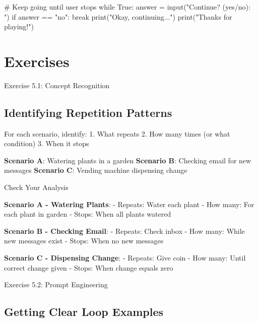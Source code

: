 \documentclass[
  letterpaper,
  DIV=11,
  numbers=noendperiod,
  oneside]{scrreprt}
\newenvironment{Shaded}{}{}
\newcommand{\BuiltInTok}[1]{\textcolor[rgb]{0.84,0.23,0.29}{#1}}
\newcommand{\CommentTok}[1]{\textcolor[rgb]{0.42,0.45,0.49}{#1}}
\newcommand{\ControlFlowTok}[1]{\textcolor[rgb]{0.84,0.23,0.29}{#1}}
\newcommand{\NormalTok}[1]{\textcolor[rgb]{0.14,0.16,0.18}{#1}}
\newcommand{\OperatorTok}[1]{\textcolor[rgb]{0.14,0.16,0.18}{#1}}
\newcommand{\StringTok}[1]{\textcolor[rgb]{0.01,0.18,0.38}{#1}}
\newcommand{\VariableTok}[1]{\textcolor[rgb]{0.89,0.38,0.04}{#1}}
\begin{document}
\begin{Shaded}
\begin{Highlighting}[]
\CommentTok{\# Keep going until user stops}
\ControlFlowTok{while} \VariableTok{True}\NormalTok{:}
\NormalTok{    answer }\OperatorTok{=} \BuiltInTok{input}\NormalTok{(}\StringTok{"Continue? (yes/no): "}\NormalTok{)}
    \ControlFlowTok{if}\NormalTok{ answer }\OperatorTok{==} \StringTok{"no"}\NormalTok{:}
        \ControlFlowTok{break}
    \BuiltInTok{print}\NormalTok{(}\StringTok{"Okay, continuing..."}\NormalTok{)}
\BuiltInTok{print}\NormalTok{(}\StringTok{"Thanks for playing!"}\NormalTok{)}
\end{Highlighting}
\end{Shaded}

\section{Exercises}\label{exercises-5}

Exercise 5.1: Concept Recognition

\subsection{Identifying Repetition
Patterns}\label{identifying-repetition-patterns}

For each scenario, identify: 1. What repeats 2. How many times (or what
condition) 3. When it stops

\textbf{Scenario A}: Watering plants in a garden \textbf{Scenario B}:
Checking email for new messages \textbf{Scenario C}: Vending machine
dispensing change

Check Your Analysis

\textbf{Scenario A - Watering Plants}: - Repeats: Water each plant - How
many: For each plant in garden - Stops: When all plants watered

\textbf{Scenario B - Checking Email}: - Repeats: Check inbox - How many:
While new messages exist - Stops: When no new messages

\textbf{Scenario C - Dispensing Change}: - Repeats: Give coin - How
many: Until correct change given - Stops: When change equals zero

Exercise 5.2: Prompt Engineering

\subsection{Getting Clear Loop
Examples}\label{getting-clear-loop-examples}
\end{document}
